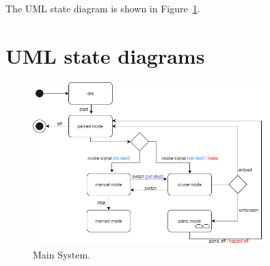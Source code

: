 \documentclass[12pt]{article}
\begin{document}
\begin{spacing}{1.5}
\noindent The UML state diagram is shown in Figure~\ref{fig:main-system-fig}.

\newpage

\section{UML state diagrams}

\begin{figure}[h!]
	\centering
		\includegraphics[width=0.8\textwidth]{./A2_Figures/4.1-Main-System.png}
		  \caption{Main System.}
  \label{fig:main-system-fig}
\end{figure}

\end{spacing}
\end{document}
